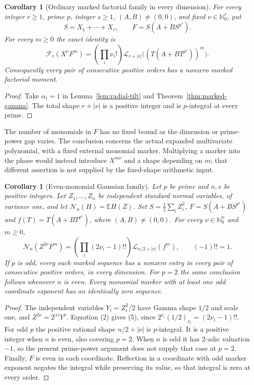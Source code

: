 \documentclass[11pt]{article}
\newtheorem{corollary}[theorem]{Corollary}
\newcommand{\N}{\mathbb N}
\newcommand{\E}{\mathbb E}
\newcommand{\Lbeta}{\mathcal L}
\begin{document}
\begin{corollary}[Ordinary marked factorial family in every dimension]
\label{cor:factorial-radial}
For every integer $r\ge1$, prime $p$, integer $s\ge1$, $(A,B)\ne(0,0)$,
and fixed $\nu\in\N_0^r$, put
\[
 S=X_1+\cdots+X_r,\qquad F=S(A+BS^{p^s}).
\]
For every $m\ge0$ the exact identity is
\[
 \boxed{\quad
 \mathcal F_r(X^\nu F^m)
 =\left(\prod_i\nu_i!\right)
   \Lbeta_{r+|\nu|}\bigl((T(A+BT^{p^s}))^m\bigr).
 \quad}                                                   \tag{4}
\]
Consequently every pair of consecutive positive orders has a nonzero
marked factorial moment.
\end{corollary}
\begin{proof}
Take $\alpha_i=1$ in Lemma~\ref{lem:radial-tilt} and
Theorem~\ref{thm:marked-gamma}. The total shape $r+|\nu|$
is a positive integer and is $p$-integral at every prime.
\end{proof}

The number of monomials in $F$ has no fixed bound as the dimension or
prime-power gap varies. The conclusion concerns the actual expanded
multivariate polynomial, with a fixed external monomial marker.
Multiplying a marker into the phase would instead introduce
$X^{m\nu}$ and a shape depending on $m$; that different assertion is
not supplied by the fixed-shape arithmetic input.

\begin{corollary}[Even-monomial Gaussian family]\label{cor:gaussian-radial}
Let $p$ be prime and $n,s$ be positive integers. Let $Z_1,\ldots,Z_n$ be independent standard normal variables, of
variance one, and let $\mathcal N_n(H)=\E H(Z)$.
Set $S=\tfrac12\sum_iZ_i^2$, $F=S(A+BS^{p^s})$ and
$f(T)=T(A+BT^{p^s})$, where $(A,B)\ne(0,0)$.
For every $\nu\in\N_0^n$ and $m\ge0$,
\[
 \boxed{\quad
 \mathcal N_n(Z^{2\nu}F^m)
 =\left(\prod_i(2\nu_i-1)!!\right)
    \Lbeta_{n/2+|\nu|}(f^m),\qquad (-1)!!=1 .
 \quad}                                                   \tag{5}
\]
If $p$ is odd, every such marked sequence has a nonzero entry in every
pair of consecutive positive orders, in every dimension.
For $p=2$ the same conclusion follows whenever $n$ is even.
Every monomial marker with at least one odd coordinate exponent has
an identically zero sequence.
\end{corollary}
\begin{proof}
The independent variables $Y_i=Z_i^2/2$ have Gamma shape $1/2$
and scale one, and $Z^{2\nu}=2^{|\nu|}Y^\nu$.
Equation (2) gives (5), since
$2^{\nu_i}(1/2)_{\nu_i}=(2\nu_i-1)!!$.
For odd $p$ the positive rational shape $n/2+|\nu|$ is $p$-integral.
It is a positive integer when $n$ is even, also covering $p=2$.
When $n$ is odd it has $2$-adic valuation $-1$, so the present
prime-power argument does not supply that case at $p=2$.
Finally, $F$ is even in each coordinate. Reflection in a coordinate
with odd marker exponent negates the integral while preserving its
value, so that integral is zero at every order.
\end{proof}
\end{document}
